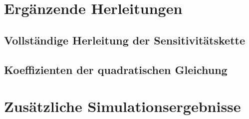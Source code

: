\chapter{Ergänzende Herleitungen}
\label{app:herleitungen}

\section{Vollständige Herleitung der Sensitivitätskette}
\label{app:sensitivitaet}

\section{Koeffizienten der quadratischen Gleichung}
\label{app:koeffizienten}

\chapter{Zusätzliche Simulationsergebnisse}
\label{app:ergebnisse}

